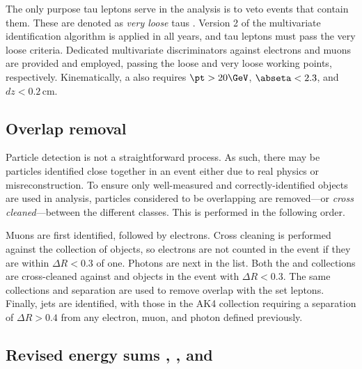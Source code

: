 The only purpose tau leptons \Ptau serve in the analysis is to veto events that contain them. These are denoted as \emph{very loose} taus \vlooseTau. Version 2 of the multivariate identification algorithm is applied in all years, and tau leptons must pass the very loose criteria. Dedicated multivariate discriminators against electrons and muons are provided and employed, passing the loose and very loose working points, respectively. Kinematically, a \vlooseTau also requires $\pt > \text{20}\GeV$, $\abseta < \text{2.3}$, and $dz <\text{0.2}$\,cm.





\subsection{Overlap removal}
\label{subsec:objects_cross_cleaning}

Particle detection is not a straightforward process. As such, there may be particles identified close together in an event either due to real physics or misreconstruction. To ensure only well-measured and correctly-identified objects are used in analysis, particles considered to be overlapping are removed---or \emph{cross cleaned}---between the different classes. This is performed in the following order.

Muons are first identified, followed by electrons. Cross cleaning is performed against the \looseMuon collection of objects, so electrons are not counted in the event if they are within $\Delta R < \text{0.3}$ of one. Photons are next in the list. Both the \loosePhoton and \mediumPhoton collections are cross-cleaned against \looseMuon and \vetoEle objects in the event with $\Delta R < \text{0.3}$. The same collections and separation are used to remove overlap with the set \vlooseTau leptons. Finally, \glspl{jet} are identified, with those in the AK4 collection requiring a separation of $\Delta R > \text{0.4}$ from any electron, muon, and photon defined previously.




\subsection{Revised energy sums \texorpdfstring{\ptvecmiss}{ptmiss}, \texorpdfstring{\HT}{HT}, and \texorpdfstring{\htvecmiss}{MHT}}
\label{subsec:objects_analysis_energy_sums}

